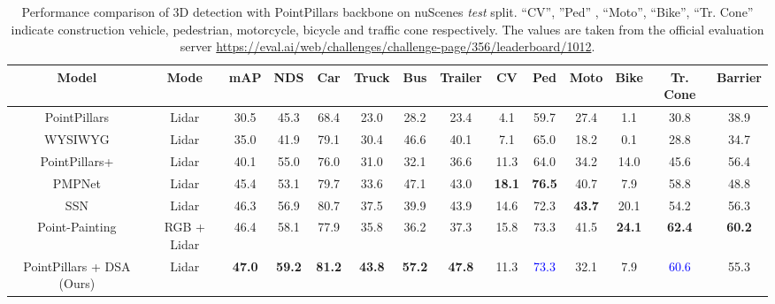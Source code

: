 \documentclass[10pt,twocolumn,letterpaper]{article}
\begin{document}
\begin{table*}[t]
\centering
\footnotesize
    \begin{tabular*}{\textwidth}{c|c|cc|cccccccccc}
        \hline
        Model & Mode & mAP & NDS & Car & Truck & Bus & Trailer & CV &
        Ped & Moto & Bike & Tr. Cone & Barrier \\
        \hline
        
        PointPillars \cite{pointpillars} & 
        Lidar & 30.5 & 45.3 & 
        68.4 & 23.0 & 28.2 & 23.4 & 4.1 &
        59.7 & 27.4 & 1.1 & 30.8 & 38.9 \\
        
        WYSIWYG \cite{wysiwyg} & 
        Lidar & 35.0 & 41.9 & 79.1 & 30.4 & 46.6 & 40.1 & 
        7.1 & 65.0 & 18.2 & 0.1 & 28.8 & 34.7 \\
        
        PointPillars+ \cite{pointpainting} & 
        Lidar & 40.1 & 55.0&
        76.0 & 31.0 & 32.1 & 36.6 & 11.3 &
        64.0 & 34.2 & 14.0  & 45.6 & 56.4 \\
        
        PMPNet \cite{pmpnet} & 
        Lidar & 45.4 & 53.1 & 79.7 & 33.6 & 47.1 & 43.0 & 
        \textbf{18.1} & \textbf{76.5} & 40.7 & 7.9 & 58.8 & 48.8 \\
        
        SSN \cite{ssn} & 
        Lidar & 46.3 & 56.9 & 
        80.7 & 37.5 & 39.9 & 43.9 & 14.6 & 72.3 & \textbf{43.7} & 20.1 & 54.2 & 56.3 \\
        
        Point-Painting \cite{pointpainting} & 
        RGB + Lidar & 46.4 & 58.1 & 
        77.9 & 35.8 & 36.2 & 37.3 & 15.8 & 73.3 & 41.5 & \textbf{24.1} & \textbf{62.4} & \textbf{60.2} \\
        
        \hline
        PointPillars + DSA (Ours) &
        Lidar & \textbf{47.0} & \textbf{59.2} &
        \textbf{81.2} & \textbf{43.8} & \textbf{57.2} & \textbf{47.8} & 11.3 & 
        \textcolor{blue}{73.3} & 32.1 & 7.9 & \textcolor{blue}{60.6} & 55.3 \\
    


        \hline
    \end{tabular*}
    \caption{Performance comparison of 3D detection with PointPillars backbone on nuScenes \textit{test} split. “CV”, ”Ped” , “Moto”, “Bike”, “Tr. Cone” indicate construction vehicle, pedestrian, motorcycle, bicycle and traffic cone respectively. 
    The values are taken from the official evaluation server \small \textcolor{mypink1}{\url{https://eval.ai/web/challenges/challenge-page/356/leaderboard/1012}}.}
    \label{tab:nuscenes_test_class}
    \vspace{-0.5cm}
\end{table*} \setlength{\tabcolsep}{8pt}
\end{document}
